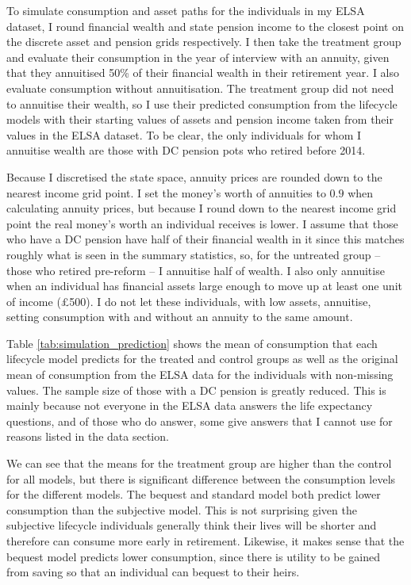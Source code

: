 \documentclass[12pt]{article}
\begin{document}
To simulate consumption and asset paths for the individuals in my ELSA dataset,
I round financial wealth and state pension income to the closest point on the
discrete asset and pension grids respectively. I then take the treatment group
and evaluate their consumption in the year of interview with an annuity, given
that they annuitised 50\% of their financial wealth in their retirement year. I
also evaluate consumption without annuitisation. The treatment group did not
need to annuitise their wealth, so I use their predicted consumption from the
lifecycle models with their starting values of assets and pension income taken
from their values in the ELSA dataset. To be clear, the only individuals for
whom I annuitise wealth are those with DC pension pots who retired before 2014.

Because I discretised the state space, annuity prices are rounded down to the
nearest income grid point. I set the money's worth of annuities to $0.9$ when
calculating annuity prices, but because I round down to the nearest income grid
point the real money's worth an individual receives is lower. I assume that
those who have a DC pension have half of their financial wealth in it since this
matches roughly what is seen in the summary statistics, so, for the untreated
group -- those who retired pre-reform -- I annuitise half of wealth. I also only
annuitise when an individual has financial assets large enough to move up at
least one unit of income (£500). I do not let these individuals, with low
assets, annuitise, setting consumption with and without an annuity to the same
amount.




Table \ref{tab:simulation_prediction} shows the mean of consumption that each
lifecycle model predicts for the treated and control groups as well as the
original mean of consumption from the ELSA data for the individuals with
non-missing values. The sample size of those with a DC pension is greatly
reduced. This is mainly because not everyone in the ELSA data answers the life
expectancy questions, and of those who do answer, some give answers that I
cannot use for reasons listed in the data section.

We can see that the means for the treatment group are higher than the control
for all models, but there is significant difference between the consumption
levels for the different models. The bequest and standard model both predict
lower consumption than the subjective model. This is not surprising given the
subjective lifecycle individuals generally think their lives will be shorter and
therefore can consume more early in retirement. Likewise, it makes sense that
the bequest model predicts lower consumption, since there is utility to be
gained from saving so that an individual can bequest to their heirs.
\end{document}

